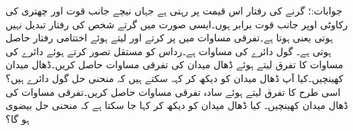 جوابات:؛ گرنے کی رفتار اس قیمت پر رہتی ہے جہاں نیچے جانب قوت  اور چھتری کی رکاوٹی اوپر جانب قوت  برابر ہوں۔ایسی صورت میں گرتے شخص کی رفتار تبدیل نہیں ہوتی یعنی  ہوتا ہے۔تفرقی مساوات میں  پر کرتے اور  لیتے ہوئے اختتامی رفتار  حاصل ہوتی ہے۔
گول دائرے کی مساوات  ہے۔رداس  کو مستقل تصور کرتے ہوئے دائرے کی مساوات کا تفرق لیتے ہوئے  ڈھال میدان کی تفرقی مساوات حاصل کریں۔ڈھال میدان کھینچیں۔کیا آپ ڈھال میدان کو دیکھ کر کہہ سکتے ہیں کہ منحنی حل گول دائرے ہیں؟ اسی طرح  کا تفرق لیتے ہوئے سادہ تفرقی مساوات حاصل کریں۔تفرقی مساوات کی ڈھال میدان کھینچیں۔ کیا ڈھال میدان کو دیکھ کر کہا جا سکتا ہے کہ منحنی حل بیضوی ہو گا؟

